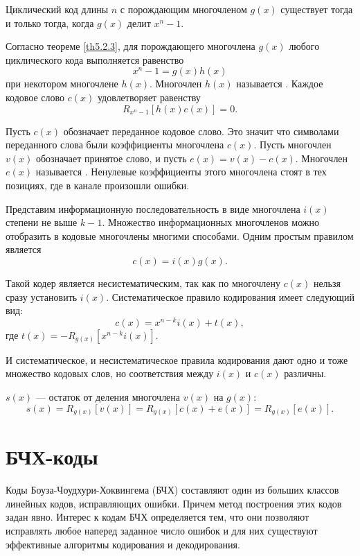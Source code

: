 \begin{theorem}
\label{th5.2.3} Циклический код длины $n$ с порождающим многочленом $g(x)$ существует тогда
и только тогда, когда $g(x)$ делит $x^n-1$.
\end{theorem}

Согласно теореме \ref{th5.2.3}, для порождающего многочлена $g(x)$ любого циклического кода выполняется 
равенство $$x^n-1=g(x)h(x)$$ при некотором многочлене $h(x)$. Многочлен $h(x)$ называется . Каждое кодовое слово $c(x)$ удовлетворяет равенству $$R_{x^n-1}[h(x)c(x)]=0.$$

Пусть $c(x)$ обозначает переданное кодовое слово. Это значит что символами переданного слова были 
коэффициенты многочлена $c(x)$. Пусть многочлен $v(x)$ обозначает принятое слово, и пусть $e(x)=v(x)-c(x)$. 
Многочлен $e(x)$ называется . Ненулевые коэффициенты этого многочлена стоят в тех 
позициях, где в канале произошли ошибки.

Представим информационную последовательность в виде многочлена $i(x)$ степени не выше $k-1$. Множество 
информационных многочленов можно отобразить в кодовые многочлены многими способами. Одним простым правилом 
является $$c(x)=i(x)g(x).$$

Такой кодер является несистематическим, так как по многочлену $c(x)$ нельзя сразу установить $i(x)$. 
Систематическое правило кодирования имеет следующий вид: $$c(x)=x^{n-k}i(x)+t(x),$$ где $t(x)=-R_{g(x)}\left[x
^{n-k}i(x)\right]$.

И систематическое, и несистематическое правила кодирования дают одно и тоже множество кодовых слов, но 
соответствия между $i(x)$ и $c(x)$ различны.

\begin{definition}
 $s(x)$ --- остаток от деления многочлена $v(x)$ на $g(x)$: $$s(x)=R_{g(x)}[v(x)]=R
_{g(x)}[c(x) + e(x)]=R_{g(x)}[e(x)].$$
\end{definition}

\section{БЧХ-коды}
Коды Боуза-Чоудхури-Хоквингема (БЧХ) составляют один из больших классов линейных кодов, исправляющих ошибки. 
Причем метод построения этих кодов задан явно. Интерес к кодам БЧХ определяется тем, что они позволяют 
исправлять любое наперед заданное число ошибок и для них существуют эффективные алгоритмы кодирования и 
декодирования.

